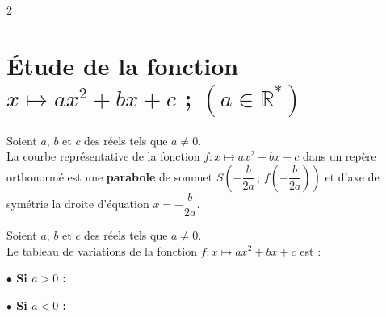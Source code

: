 \begin{multicols}{2}


\columnbreak


\end{multicols}



\section{Étude de la fonction $x \mapsto ax^2 + bx + c$  ; $(a \in \mathbb{R}^*)$ }

\begin{Definition}[][]
Soient $a$, $b$ et $c$ des réels tels que $a \neq 0$. \\
La courbe représentative de la fonction $f : x \mapsto ax^2 + bx + c$ dans un repère orthonormé est
une \textbf{parabole} de sommet $S\!\left(-\dfrac{b}{2a}\,;\,f\!\left(-\dfrac{b}{2a}\right)\right)$
et d'axe de symétrie la droite d'équation $x = -\dfrac{b}{2a}$.
\end{Definition}





\begin{Propriete}[][5 min]
Soient $a$, $b$ et $c$ des réels tels que $a \neq 0$. \\
Le tableau de variations de la fonction $f : x \mapsto ax^2 + bx + c$ est :

\vspace{0.4cm}
\noindent
\begin{minipage}[t]{0.48\linewidth}
\begin{center}
\textbf{$\bullet$ Si $a > 0$ :}
\end{center}
\vspace{0.2cm}
\begin{center}
\end{center}
\end{minipage}
\hfill
\begin{minipage}[t]{0.48\linewidth}
\begin{center}
\textbf{$\bullet$ Si $a < 0$ :}
\end{center}
\vspace{0.2cm}
\begin{center}
\end{center}
\end{minipage}
\end{Propriete}




